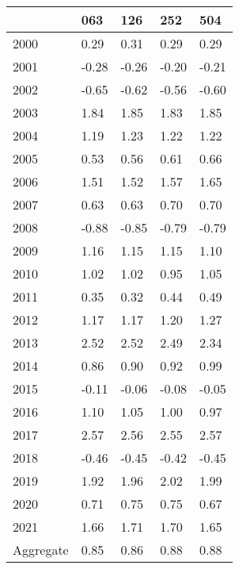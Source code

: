 \begin{tabular}{lllll}
\toprule
 & 063 & 126 & 252 & 504 \\
\midrule
2000 & 0.29 & 0.31 & 0.29 & 0.29 \\
2001 & -0.28 & -0.26 & -0.20 & -0.21 \\
2002 & -0.65 & -0.62 & -0.56 & -0.60 \\
2003 & 1.84 & 1.85 & 1.83 & 1.85 \\
2004 & 1.19 & 1.23 & 1.22 & 1.22 \\
2005 & 0.53 & 0.56 & 0.61 & 0.66 \\
2006 & 1.51 & 1.52 & 1.57 & 1.65 \\
2007 & 0.63 & 0.63 & 0.70 & 0.70 \\
2008 & -0.88 & -0.85 & -0.79 & -0.79 \\
2009 & 1.16 & 1.15 & 1.15 & 1.10 \\
2010 & 1.02 & 1.02 & 0.95 & 1.05 \\
2011 & 0.35 & 0.32 & 0.44 & 0.49 \\
2012 & 1.17 & 1.17 & 1.20 & 1.27 \\
2013 & 2.52 & 2.52 & 2.49 & 2.34 \\
2014 & 0.86 & 0.90 & 0.92 & 0.99 \\
2015 & -0.11 & -0.06 & -0.08 & -0.05 \\
2016 & 1.10 & 1.05 & 1.00 & 0.97 \\
2017 & 2.57 & 2.56 & 2.55 & 2.57 \\
2018 & -0.46 & -0.45 & -0.42 & -0.45 \\
2019 & 1.92 & 1.96 & 2.02 & 1.99 \\
2020 & 0.71 & 0.75 & 0.75 & 0.67 \\
2021 & 1.66 & 1.71 & 1.70 & 1.65 \\
Aggregate & 0.85 & 0.86 & 0.88 & 0.88 \\
\bottomrule
\end{tabular}
